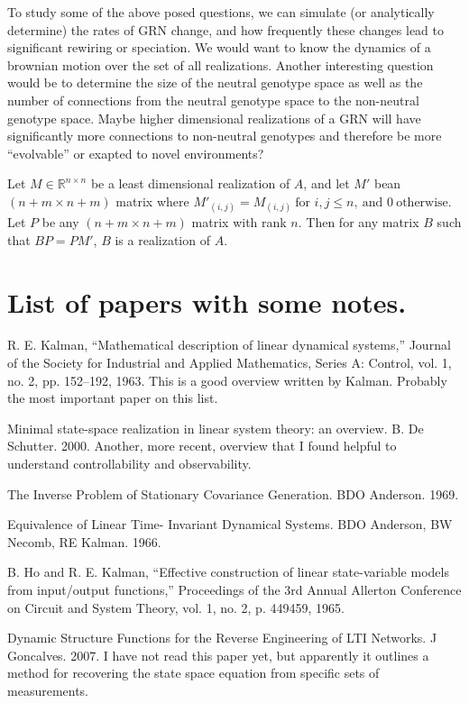 \documentclass[11 pt]{article}
\begin{document}
To study some of the above posed questions, we can simulate (or analytically
determine) the rates of GRN change, and how frequently these changes lead to
significant rewiring or speciation. We would want to know the dynamics of a
brownian motion over the set of all realizations.  Another interesting question
would be to determine the size of the neutral genotype space as well as the
number of connections from the neutral genotype space to the non-neutral
genotype space. Maybe higher dimensional realizations of a GRN will have
significantly more connections to non-neutral genotypes and therefore be more
``evolvable'' or exapted to novel environments? 

Let $M \in \mathbb{R}^{n \times n}$ be a least dimensional realization of $A$,
and let $M'$ bean $(n+m \times n+m)$ matrix where $M'_{(i,j)} = M_{(i,j)} \
\text{for } i,j \leq n, \ \text{and } 0 \ \text{otherwise}$. Let $P$ be any
$(n+m \times n+m)$ matrix with rank $n$. Then for any matrix $B$ such that $BP
= PM'$, $B$ is a realization of $A$.     

\section{List of papers with some notes.}

R. E. Kalman, “Mathematical description of linear dynamical systems,” Journal of the Society for Industrial and Applied Mathematics, Series A: Control, vol. 1, no. 2, pp. 152–192, 1963.
This is a good overview written by Kalman. Probably the most important paper on this list.

Minimal state-space realization in linear system theory: an overview. B. De Schutter. 2000.
Another, more recent, overview that I found helpful to understand controllability and observability. 

The Inverse Problem of Stationary Covariance Generation. BDO Anderson. 1969.

Equivalence of Linear Time- Invariant Dynamical Systems. BDO Anderson, BW Necomb, RE Kalman. 1966. 

B. Ho and R. E. Kalman, “Effective construction of linear state-variable models from input/output functions,” Proceedings of the 3rd Annual Allerton Conference on Circuit and System Theory, vol. 1, no. 2, p. 449459, 1965.

Dynamic Structure Functions for the Reverse Engineering of LTI Networks. J Goncalves. 2007.
I have not read this paper yet, but apparently it outlines a method for recovering the state space equation from specific sets of measurements.
\end{document}
